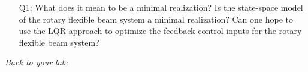 \documentclass[12pt]{report}
\newcommand\drew[1]{\textcolor{red}{#1}}
\begin{document}
\begin{enumerate}[Question]
    \item[Q1:] What does it mean to be a minimal realization? Is the state-space model of the rotary flexible beam system a minimal realization? Can one hope to use the LQR approach to optimize the feedback control inputs for the rotary flexible beam system?\\
\end{enumerate}

\noindent \emph{Back to your lab:}
\end{document}
